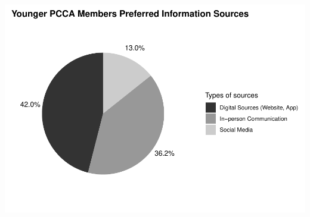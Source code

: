 \documentclass[
]{article}
\begin{document}
\includegraphics{pcca_survey_files/figure-latex/information-young-1.pdf}
\end{document}
